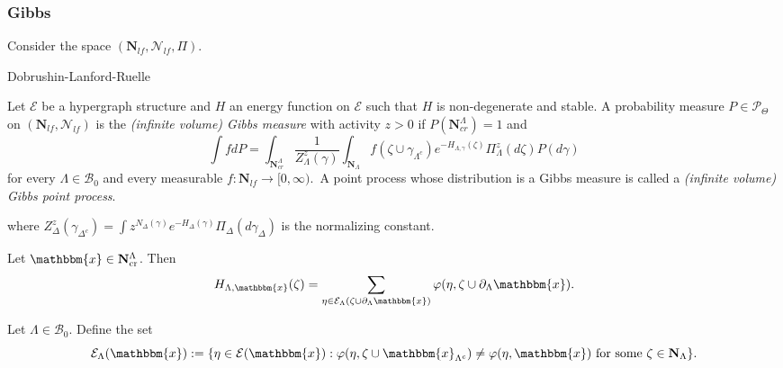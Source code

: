 \documentclass[c, 10pt]{beamer}
\newcommand{\x}{{\mathbbm{x}}}
\begin{document}
\begin{frame}\frametitle{Gibbs}




Consider the space $(\mathbf N_{lf}, \mathcal N_{lf}, \Pi)$.

Dobrushin-Lanford-Ruelle
\begin{definition}\label{def:GPP}
	Let $\mathcal E$ be a hypergraph structure and $H$ an energy function on $\mathcal E$ such that $H$ is non-degenerate and stable. A probability measure $P\in \mathcal P_\Theta$ on $(\mathbf N_{lf},\mathcal N_{lf})$ is the \textit{(infinite volume) Gibbs measure} with activity $z>0$ if $P(\mathbf N^\Lambda_{cr})=1$ and
	\begin{equation}\label{eq:DLR}
		\int f dP = \int_{\mathbf N^\Lambda_{cr}} \frac 1 {Z^z_{\Lambda}(\gamma)} \int_{\mathbf N_\Lambda} f(\zeta \cup \gamma_{\Lambda^c}) e^{-H_{\Lambda,\gamma}(\zeta)} \Pi^z_\Lambda (d\zeta) P(d\gamma)
	\end{equation}
		for every $\Lambda \in \mathcal B_0$ and every measurable $f:\mathbf N_{lf} \to [0,\infty)$.\
		A point process whose distribution is a Gibbs measure is called a \textit{(infinite volume) Gibbs point process}.
\end{definition}


		where $Z^z_{\Delta}(\gamma_{\Delta^c}) = \int z^{N_\Delta(\gamma)} e^{-H_\Delta(\gamma)} \Pi_\Delta(d\gamma_\Delta)$ is the normalizing constant. 

Let $\x\in \mathbf N^\Lambda_\mathrm{cr}$. Then 
	$$H_{\Lambda,\x}(\zeta) = \sum_{\eta \in \mathcal E_\Lambda(\zeta \cup \partial_\Lambda \x)} \varphi(\eta, \zeta \cup \partial_\Lambda \x).$$


\begin{definition}\label{def:Eset} Let $\Lambda \in \mathcal B_0$. Define the set 
	$$\mathcal E_\Lambda(\x) := \{ \eta \in \mathcal E(\x): \varphi(\eta,\zeta \cup \x_{\Lambda^c}) \neq \varphi(\eta,\x) \text{ for some } \zeta \in \mathbf N_\Lambda \}.$$
\end{definition}

\end{frame}
\end{document}
